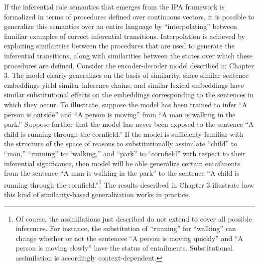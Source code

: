 If the inferential role semantics that emerges from the IPA framework is formalized in terms of procedures defined over continuous vectors, it is possible to generalize this semantics over an entire language by ``interpolating'' between familiar examples of correct inferential transitions. Interpolation is achieved by exploiting similarities between the procedures that are used to generate the inferential transitions, along with similarities between the states over which these procedures are defined. Consider the encoder-decoder model described in Chapter 3. The model clearly generalizes on the basis of similarity, since similar sentence embeddings yield similar inference chains, and similar lexical embeddings have similar substitutional effects on the embeddings corresponding to the sentences in which they occur. To illustrate, suppose the model has been trained to infer ``A person is outside'' and ``A person is moving'' from ``A man is walking in the park.'' Suppose further that the model has never been exposed to the sentence ``A child is running through the cornfield.'' If the model is sufficienty familiar with the structure of the space of reasons to substitutionally assimilate ``child'' to ``man,'' ``running'' to ``walking,'' and ``park'' to ``cornfield'' with respect to their inferential significance, then model will be able generalize certain entailments from the sentence ``A man is walking in the park'' to the sentence ``A child is running through the cornfield.''\footnote{Of course, the assimilations just described do not extend to cover all possible inferences. For instance, the substitution of ``running'' for ``walking'' can change whether or not the sentences ``A person is moving quickly'' and ``A person is moving slowly'' have the status of entailments. Substitutional assimilation is accordingly context-dependent.} The results described in Chapter 3 illustrate how this kind of similarity-based generalization works in practice.

